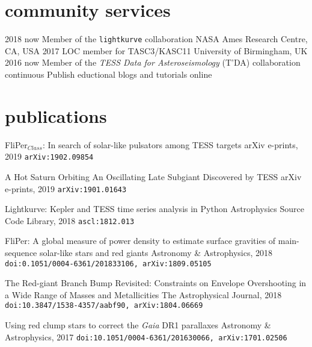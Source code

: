 \documentclass[]{k-cv} %
\begin{document}
\clearpage
{}

\section{community services}
\begin{entrylist}
\entrythree
{2018 \to now}
{Member of the \texttt{lightkurve} collaboration}
{NASA Ames Research Centre, CA, USA}
\entrythree
{2017}
{LOC member for TASC3/KASC11}
{University of Birmingham, UK}
\entrythree
{2016 \to now}
{Member of the \emph{TESS Data for Asteroseismology} (T'DA) collaboration }
{}
\entrythree
{continuous}
{Publish eductional blogs and tutorials online}
{}
\end{entrylist}
\section{publications}
{FliPer$_{Class}$: In search of solar-like pulsators among TESS targets}
{arXiv e-prints, 2019}
{\texttt{arXiv:1902.09854}}

{{A Hot Saturn Orbiting An Oscillating Late Subgiant Discovered by TESS}}
{arXiv e-prints, 2019}
{\texttt{arXiv:1901.01643}}

{Lightkurve: Kepler and TESS time series analysis in Python}
{Astrophysics Source Code Library, 2018}
{\texttt{ascl:1812.013}}

{FliPer: A global measure of power density to estimate surface gravities of main-sequence solar-like stars and red giants}
{Astronomy \& Astrophysics, 2018}
{\texttt{doi:0.1051/0004-6361/201833106, arXiv:1809.05105}}

{The Red-giant Branch Bump Revisited: Constraints on Envelope Overshooting in a Wide Range of Masses and Metallicities}
{The Astrophysical Journal, 2018}
{\texttt{doi:10.3847/1538-4357/aabf90, arXiv:1804.06669}}

{Using red clump stars to correct the \emph{Gaia} DR1 parallaxes}
{Astronomy \& Astrophysics, 2017}
{\texttt{doi:10.1051/0004-6361/201630066, arXiv:1701.02506}}
\end{document}
